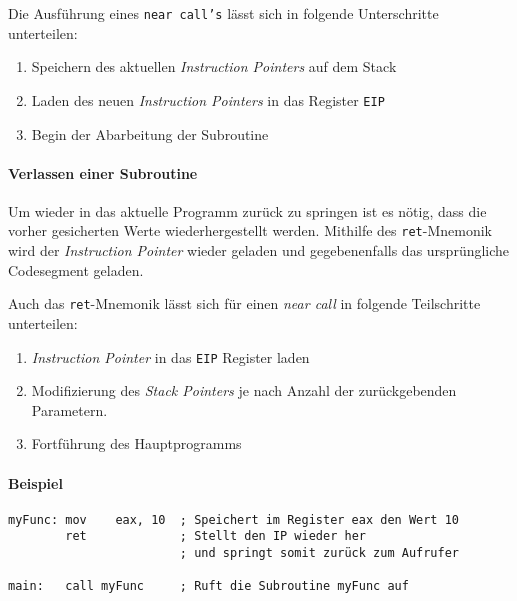 Die Ausführung eines \texttt{near call's} lässt sich in folgende Unterschritte unterteilen:

\begin{enumerate}
    \item Speichern des aktuellen \textit{Instruction Pointers} auf dem Stack
    \item Laden des neuen \textit{Instruction Pointers} in das Register \texttt{EIP}
    \item Begin der Abarbeitung der Subroutine
\end{enumerate}

\paragraph{Verlassen einer Subroutine}

Um wieder in das aktuelle Programm zurück zu springen ist es nötig, dass die vorher gesicherten Werte wiederhergestellt werden.
Mithilfe des \texttt{ret}-Mnemonik wird der \textit{Instruction Pointer} wieder geladen und gegebenenfalls das ursprüngliche Codesegment geladen.

Auch das \texttt{ret}-Mnemonik lässt sich für einen \textit{near call} in folgende Teilschritte unterteilen:
\begin{enumerate}
    \item \textit{Instruction Pointer} in das \texttt{EIP} Register laden
    \item Modifizierung des \textit{Stack Pointers} je nach Anzahl der zurückgebenden Parametern.
    \item Fortführung des Hauptprogramms
\end{enumerate}

\paragraph{Beispiel\newline}\makebox{}
\begin{lstlisting}
myFunc: mov    eax, 10  ; Speichert im Register eax den Wert 10
        ret             ; Stellt den IP wieder her
                        ; und springt somit zurück zum Aufrufer

main:   call myFunc     ; Ruft die Subroutine myFunc auf
\end{lstlisting}
